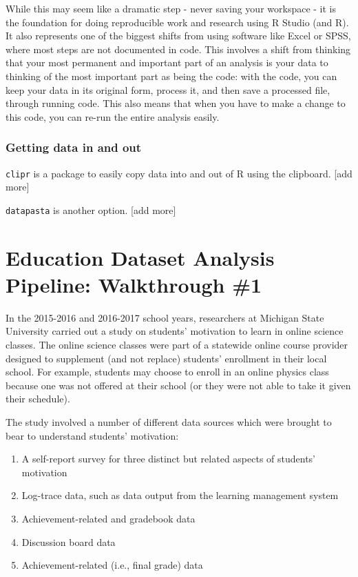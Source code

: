 \documentclass[]{book}
\providecommand{\tightlist}{%
  \setlength{\itemsep}{0pt}\setlength{\parskip}{0pt}}
\begin{document}
While this may seem like a dramatic step - never saving your workspace -
it is the foundation for doing reproducible work and research using R
Studio (and R). It also represents one of the biggest shifts from using
software like Excel or SPSS, where most steps are not documented in
code. This involves a shift from thinking that your most permanent and
important part of an analysis is your data to thinking of the most
important part as being the code: with the code, you can keep your data
in its original form, process it, and then save a processed file,
through running code. This also means that when you have to make a
change to this code, you can re-run the entire analysis easily.

\subsection{Getting data in and out}\label{getting-data-in-and-out}

\texttt{clipr} is a package to easily copy data into and out of R using
the clipboard. {[}add more{]}

\texttt{datapasta} is another option. {[}add more{]}

\chapter{Education Dataset Analysis Pipeline: Walkthrough
\#1}\label{education-dataset-analysis-pipeline-walkthrough-1}

In the 2015-2016 and 2016-2017 school years, researchers at Michigan
State University carried out a study on students' motivation to learn in
online science classes. The online science classes were part of a
statewide online course provider designed to supplement (and not
replace) students' enrollment in their local school. For example,
students may choose to enroll in an online physics class because one was
not offered at their school (or they were not able to take it given
their schedule).

The study involved a number of different data sources which were brought
to bear to understand students' motivation:

\begin{enumerate}
\def\labelenumi{\arabic{enumi}.}
\tightlist
\item
  A self-report survey for three distinct but related aspects of
  students' motivation
\item
  Log-trace data, such as data output from the learning management
  system
\item
  Achievement-related and gradebook data
\item
  Discussion board data
\item
  Achievement-related (i.e., final grade) data
\end{enumerate}
\end{document}
